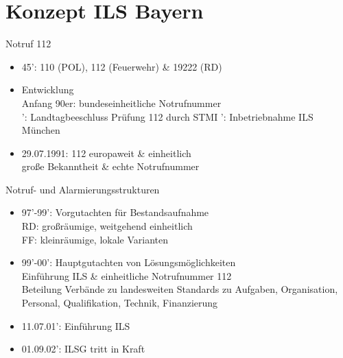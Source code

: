 \section{Konzept ILS Bayern}
\begin{sectionbox}{Notruf 112}
    \begin{itemize}
        \item 45': 110 (POL), 112 (Feuerwehr) \& 19222 (RD)
        \item Entwicklung\\
        \ra Anfang 90er: bundeseinheitliche Notrufnummer\\
        ': Landtagbeeschluss Prüfung 112 durch STMI
        ': Inbetriebnahme ILS München
        \item 29.07.1991: 112 europaweit \& einheitlich\\
        \ra große Bekanntheit \& echte Notrufnummer
    \end{itemize}
\end{sectionbox}
\begin{sectionbox}{Notruf- und Alarmierungsstrukturen}
    \begin{itemize}
        \item 97'-99': Vorgutachten für Bestandsaufnahme\\
        \ra RD: großräumige, weitgehend einheitlich\\
        \ra FF: kleinräumige, lokale Varianten
        \item 99'-00': Hauptgutachten von Lösungsmöglichkeiten\\
        \ra Einführung ILS \& einheitliche Notrufnummer 112\\
        \ra Beteilung Verbände zu landesweiten Standards zu Aufgaben, Organisation, Personal, Qualifikation, Technik, Finanzierung
        \item 11.07.01': Einführung ILS
        \item 01.09.02': ILSG tritt in Kraft 
    \end{itemize}
\end{sectionbox}
